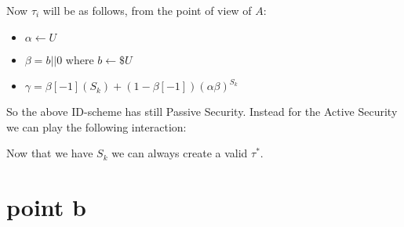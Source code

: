 \newpage

Now $\tau_i$ will be as follows, from the point of view of $A$:

\begin{itemize}
    \item $\alpha\leftarrow U$
    \item $\beta=b||0$ where $b\leftarrow\$ U$
    \item $\gamma=\beta[-1](S_k)+(1-\beta[-1])(\alpha \beta)^{S_k}$
\end{itemize}

So the above ID-scheme has still Passive Security. Instead for the Active Security we can play the following interaction:

\begin{figure}[h!]
    \centering
    \sdinit{}
\end{figure}

Now that we have $S_k$ we can always create a valid $\tau^*$.

\newpage
\section{point b}

